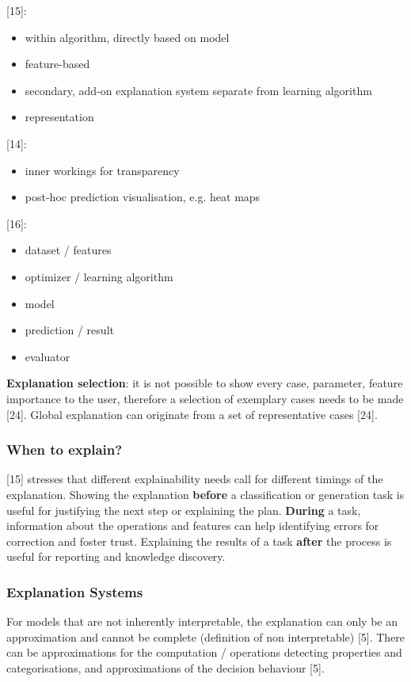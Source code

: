 [15]:
\begin{itemize}
	\item within algorithm, directly based on model
	\item feature-based
	\item secondary, add-on explanation system separate from learning algorithm
	\item representation
\end{itemize}
[14]:
\begin{itemize}
	\item inner workings for transparency
	\item post-hoc prediction visualisation, e.g. heat maps
\end{itemize}
[16]:
\begin{itemize}
	\item dataset / features
	\item optimizer / learning algorithm
	\item model 
	\item prediction / result
	\item evaluator
\end{itemize}

\textbf{Explanation selection}: it is not possible to show every case, parameter, feature importance to the user, therefore a selection of exemplary cases needs to be made [24]. Global explanation can originate from a set of representative cases [24].



\subsubsection{When to explain?}
[15] stresses that different explainability needs call for different timings of the explanation. Showing the explanation \textbf{before} a classification or generation task is useful for justifying the next step or explaining the plan. {\color{green}\textbf{During} a task, information about the operations and features can help identifying errors for correction and foster trust.} Explaining the results of a task \textbf{after} the process is useful for reporting and knowledge discovery.



\subsubsection{Explanation Systems}
For models that are not inherently interpretable, the explanation can only be an approximation and cannot be complete (definition of non interpretable) [5]. There can be approximations for the computation / operations detecting properties and categorisations, and approximations of the decision behaviour [5].\newline

